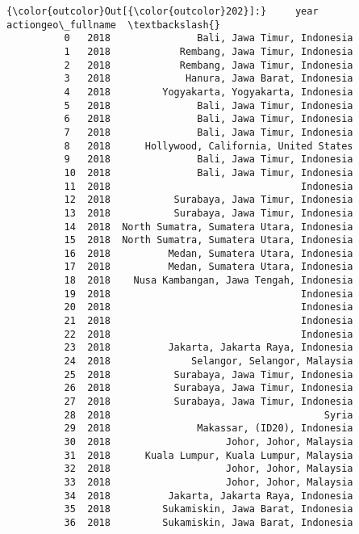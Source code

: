 \documentclass[11pt]{article}
\begin{document}
\begin{Verbatim}[commandchars=\\\{\}]
{\color{outcolor}Out[{\color{outcolor}202}]:}     year                        actiongeo\_fullname  \textbackslash{}
          0   2018               Bali, Jawa Timur, Indonesia   
          1   2018            Rembang, Jawa Timur, Indonesia   
          2   2018            Rembang, Jawa Timur, Indonesia   
          3   2018             Hanura, Jawa Barat, Indonesia   
          4   2018         Yogyakarta, Yogyakarta, Indonesia   
          5   2018               Bali, Jawa Timur, Indonesia   
          6   2018               Bali, Jawa Timur, Indonesia   
          7   2018               Bali, Jawa Timur, Indonesia   
          8   2018      Hollywood, California, United States   
          9   2018               Bali, Jawa Timur, Indonesia   
          10  2018               Bali, Jawa Timur, Indonesia   
          11  2018                                 Indonesia   
          12  2018           Surabaya, Jawa Timur, Indonesia   
          13  2018           Surabaya, Jawa Timur, Indonesia   
          14  2018  North Sumatra, Sumatera Utara, Indonesia   
          15  2018  North Sumatra, Sumatera Utara, Indonesia   
          16  2018          Medan, Sumatera Utara, Indonesia   
          17  2018          Medan, Sumatera Utara, Indonesia   
          18  2018    Nusa Kambangan, Jawa Tengah, Indonesia   
          19  2018                                 Indonesia   
          20  2018                                 Indonesia   
          21  2018                                 Indonesia   
          22  2018                                 Indonesia   
          23  2018          Jakarta, Jakarta Raya, Indonesia   
          24  2018              Selangor, Selangor, Malaysia   
          25  2018           Surabaya, Jawa Timur, Indonesia   
          26  2018           Surabaya, Jawa Timur, Indonesia   
          27  2018           Surabaya, Jawa Timur, Indonesia   
          28  2018                                     Syria   
          29  2018               Makassar, (ID20), Indonesia   
          30  2018                    Johor, Johor, Malaysia   
          31  2018      Kuala Lumpur, Kuala Lumpur, Malaysia   
          32  2018                    Johor, Johor, Malaysia   
          33  2018                    Johor, Johor, Malaysia   
          34  2018          Jakarta, Jakarta Raya, Indonesia   
          35  2018         Sukamiskin, Jawa Barat, Indonesia   
          36  2018         Sukamiskin, Jawa Barat, Indonesia   

\end{Verbatim}
\end{document}
